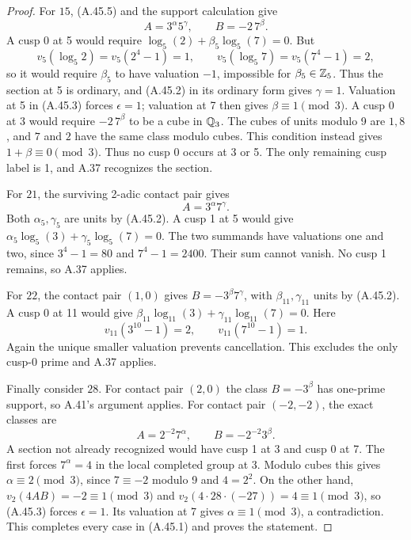 \begin{proof}
For $15$, (A.45.5) and the support calculation give
\[
                    A=3^\alpha5^\gamma,
                    \qquad B=-2\,7^\beta.
\]
A cusp 0 at 5 would require
$\log_5(2)+\beta_5\log_5(7)=0$.
But
\[
 v_5(\log_5 2)=v_5(2^4-1)=1,\qquad
 v_5(\log_5 7)=v_5(7^4-1)=2,
\]
so it would require $\beta_5$ to have valuation $-1$, impossible
for $\beta_5\in\mathbb Z_5$.  Thus the section at 5 is ordinary, and
(A.45.2) in its ordinary form gives $\gamma=1$.
Valuation at 5 in (A.45.3) forces $\epsilon=1$; valuation at 7
then gives $\beta\equiv1\pmod3$.  A cusp 0 at 3 would require
$-2\,7^\beta$ to be a cube in $\mathbb Q_3$.  The cubes of units modulo
9 are $1,8$, and $7$ and $2$ have the same class modulo cubes.
This condition instead gives $1+\beta\equiv0\pmod3$.
Thus no cusp 0 occurs at 3 or 5.  The only remaining cusp label is
1, and A.37 recognizes the section.

For $21$, the surviving 2-adic contact pair gives
\[
                         A=3^\alpha7^\gamma.
\]
Both $\alpha_5,\gamma_5$ are units by (A.45.2).
A cusp 1 at 5 would give
$\alpha_5\log_5(3)+\gamma_5\log_5(7)=0$.
The two summands have valuations one and two, since
$3^4-1=80$ and $7^4-1=2400$.  Their sum cannot vanish.
No cusp 1 remains, so A.37 applies.

For $22$, the contact pair $(1,0)$ gives
$B=-3^\beta7^\gamma$, with $\beta_{11},\gamma_{11}$ units by
(A.45.2).  A cusp 0 at 11 would give
$\beta_{11}\log_{11}(3)+\gamma_{11}\log_{11}(7)=0$.
Here
\[
 v_{11}(3^{10}-1)=2,
             \qquad v_{11}(7^{10}-1)=1.
\]
Again the unique smaller valuation prevents cancellation.
This excludes the only cusp-0 prime and A.37 applies.

Finally consider $28$.  For contact pair $(2,0)$ the class
$B=-3^\beta$ has one-prime support, so A.41's argument applies.
For contact pair $(-2,-2)$, the exact classes are
\[
                 A=2^{-2}7^\alpha,
                 \qquad B=-2^{-2}3^\beta.
\]
A section not already recognized would have cusp 1 at 3 and cusp 0
at 7.  The first forces $7^\alpha=4$ in the local completed group
at 3.  Modulo cubes this gives $\alpha\equiv2\pmod3$, since
$7\equiv-2$ modulo 9 and $4=2^2$.  On the other hand,
$v_2(4AB)=-2\equiv1\pmod3$ and
$v_2(4\cdot28\cdot(-27))=4\equiv1\pmod3$, so (A.45.3)
forces $\epsilon=1$.  Its valuation at 7 gives
$\alpha\equiv1\pmod3$, a contradiction.
This completes every case in (A.45.1) and proves the statement.
\end{proof}
